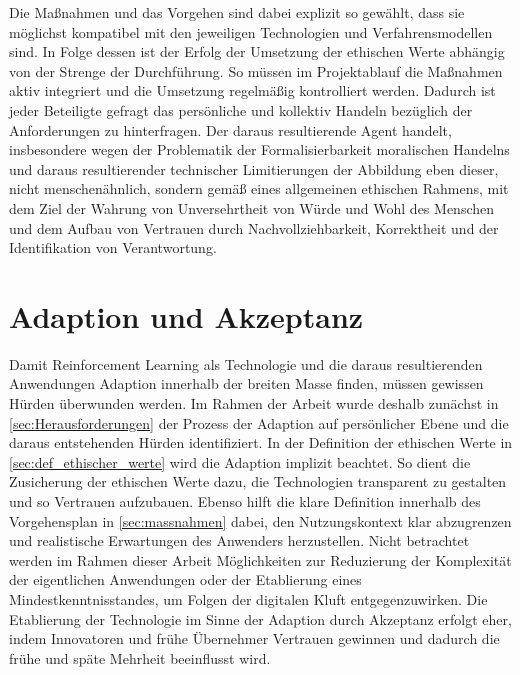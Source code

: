 \ab 
Die Maßnahmen und das Vorgehen sind dabei explizit so gewählt, dass sie möglichst kompatibel mit den jeweiligen Technologien und Verfahrensmodellen sind.
In Folge dessen ist der Erfolg der Umsetzung der ethischen Werte abhängig von der Strenge der Durchführung.
So müssen im Projektablauf die Maßnahmen aktiv integriert und die Umsetzung regelmäßig kontrolliert werden.
Dadurch ist jeder Beteiligte gefragt das persönliche und kollektiv Handeln bezüglich der Anforderungen zu hinterfragen.
Der daraus resultierende Agent handelt, insbesondere wegen der Problematik der Formalisierbarkeit moralischen Handelns und daraus resultierender technischer Limitierungen der Abbildung eben dieser, nicht menschenähnlich, sondern gemäß eines allgemeinen ethischen Rahmens, mit dem Ziel der Wahrung von Unversehrtheit von Würde und Wohl des Menschen und dem Aufbau von Vertrauen durch Nachvollziehbarkeit, Korrektheit und der Identifikation von Verantwortung.

\section{Adaption und Akzeptanz}
Damit Reinforcement Learning als Technologie und die daraus resultierenden Anwendungen Adaption innerhalb der breiten Masse finden, müssen gewissen Hürden überwunden werden.
Im Rahmen der Arbeit wurde deshalb zunächst in \autoref{sec:Herausforderungen} der Prozess der Adaption auf persönlicher Ebene und die daraus entstehenden Hürden identifiziert.
In der Definition der ethischen Werte in \autoref{sec:def_ethischer_werte} wird die Adaption implizit beachtet.
So dient die Zusicherung der ethischen Werte dazu, die Technologien transparent zu gestalten und so Vertrauen aufzubauen.
Ebenso hilft die klare Definition innerhalb des Vorgehensplan in \autoref{sec:massnahmen} dabei, den Nutzungskontext klar abzugrenzen und realistische Erwartungen des Anwenders herzustellen.
Nicht betrachtet werden im Rahmen dieser Arbeit Möglichkeiten zur Reduzierung der Komplexität der eigentlichen Anwendungen oder der Etablierung eines Mindestkenntnisstandes, um Folgen der digitalen Kluft entgegenzuwirken.
Die Etablierung der Technologie im Sinne der Adaption durch Akzeptanz erfolgt eher, indem Innovatoren \cite[S. 519]{karnowski2013} und frühe Übernehmer Vertrauen gewinnen und dadurch die frühe und späte Mehrheit beeinflusst wird.


